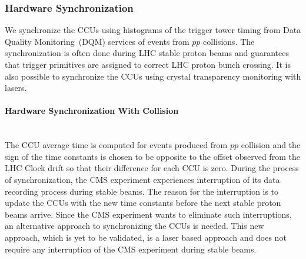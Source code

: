 \subsubsection{Hardware Synchronization}
We synchronize the CCUs using histograms of the trigger tower timing from Data Quality Monitoring~(DQM) services of events from $pp$ collisions. The synchronization is often done during LHC stable proton beams and guarantees that trigger primitives are assigned to correct LHC proton bunch crossing. It is also possible to synchronize the CCUs using crystal transparency monitoring with lasers.
\paragraph{Hardware Synchronization With Collision} \mbox{}\\
The CCU average time is computed for events produced from $pp$ collision and the sign of the time constants is chosen to be opposite to the offset observed from the LHC Clock drift so that their difference for each CCU is zero. During the process of synchronization, the CMS experiment experiences interruption of its data recording process during stable beams. The reason for the interruption is to update the CCUs with the new time constants before the next stable proton beams arrive. Since the CMS experiment wants to eliminate such interruptions, an alternative approach to synchronizing the CCUs is needed. This new approach, which is yet to be validated, is a laser based approach and does not require any interruption of the CMS experiment during stable beams.

